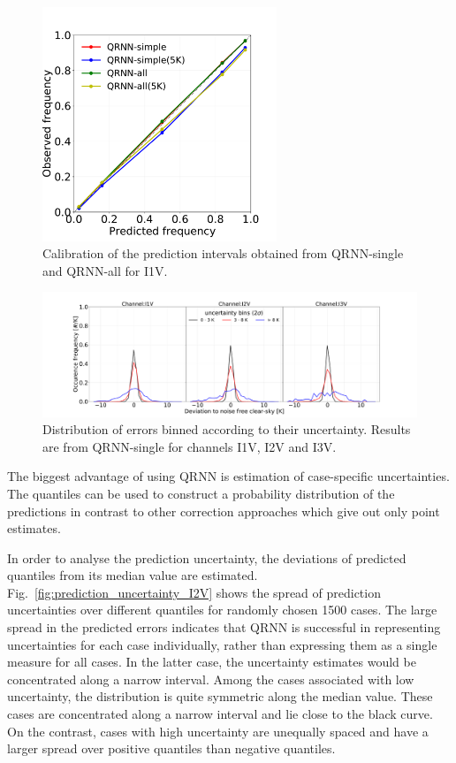 \documentclass[amt, manuscript]{copernicus}
\begin{document}
\begin{figure}[t]
	\includegraphics[height = 70mm]{Figures/calibration_QRNN_I1V.pdf}	
	\caption{Calibration of the prediction intervals obtained from QRNN-single and QRNN-all for I1V. }
	\label{fig:calibration_I1V}	
\end{figure}
\begin{figure}[t]
	\includegraphics[width=\textwidth]{Figures/PDF_uncertainty_bins_QRNN-single.pdf}	
	\caption{Distribution of errors binned according to their uncertainty. Results are from QRNN-single for channels I1V, I2V and I3V.}
	\label{fig:error_distribution_uncertainty_bins}	
\end{figure}

The biggest advantage of using QRNN is estimation of case-specific uncertainties. The quantiles can be used to construct a probability distribution of the predictions in contrast to other correction approaches which give out only point estimates. 

In order to analyse the prediction uncertainty, the deviations of predicted quantiles from its median value are estimated. Fig.~\ref{fig:prediction_uncertainty_I2V} shows the spread of prediction uncertainties over different quantiles for randomly chosen 1500 cases. The large spread in the predicted errors indicates that QRNN is successful in representing uncertainties for each case individually, rather than expressing them as a single measure for all cases. In the latter case, the uncertainty estimates would be concentrated along a narrow interval. Among the cases associated with low uncertainty, the distribution is quite symmetric along the median value. These cases are concentrated along a narrow interval and lie close to the black curve. On the contrast, cases with high uncertainty are unequally spaced and have a larger spread over positive quantiles than negative quantiles.
\end{document}
